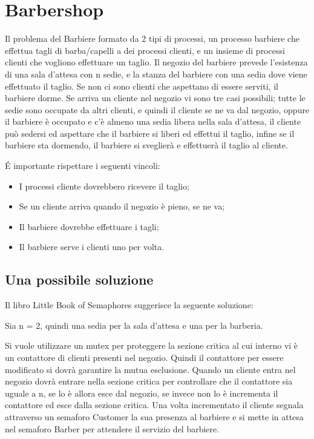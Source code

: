 \section{Barbershop}
Il problema del Barbiere formato da 2 tipi di processi, un processo barbiere che effettua tagli di barba/capelli a dei processi clienti, e un insieme di processi clienti che vogliono effettuare un taglio. Il negozio del barbiere prevede l'esistenza di una sala d'attesa con n sedie, e la stanza del barbiere con una sedia dove viene effettuato il taglio. Se non ci sono clienti che aspettano di essere serviti, il barbiere dorme. Se arriva un cliente nel negozio vi sono tre casi possibili; tutte le sedie sono occupate da altri clienti, e quindi il cliente se ne va dal negozio, oppure il barbiere è occupato e c'è almeno una sedia libera nella sala d'attesa, il cliente può sedersi ed aspettare che il barbiere si liberi ed effettui il taglio, infine se il barbiere sta dormendo, il barbiere si sveglierà e effettuerà il taglio al cliente.

É importante rispettare i seguenti vincoli:

\begin{itemize}
	\item I processi cliente dovrebbero ricevere il taglio;
	\item Se un cliente arriva quando il negozio è pieno, se ne va;
	\item Il barbiere dovrebbe effettuare i tagli;
	\item Il barbiere serve i clienti uno per volta.
	
\end{itemize}

\subsection{Una possibile soluzione}
Il libro Little Book of Semaphores suggerisce la seguente soluzione: 

Sia n = 2, quindi una sedia per la sala d'attesa e una per la barberia. 

Si vuole utilizzare un mutex per proteggere la sezione critica al cui interno vi è un contattore di clienti presenti nel negozio. Quindi il contattore per essere modificato si dovrà garantire la mutua esclusione. Quando un cliente entra nel negozio dovrà entrare nella sezione critica per controllare che il contattore sia uguale a n, se lo è allora esce dal negozio, se invece non lo è incrementa il contattore ed esce dalla sezione critica. Una volta incrementato il cliente segnala attraverso un semaforo Customer la sua presenza al barbiere e si mette in attesa nel semaforo Barber per attendere il servizio del barbiere.

